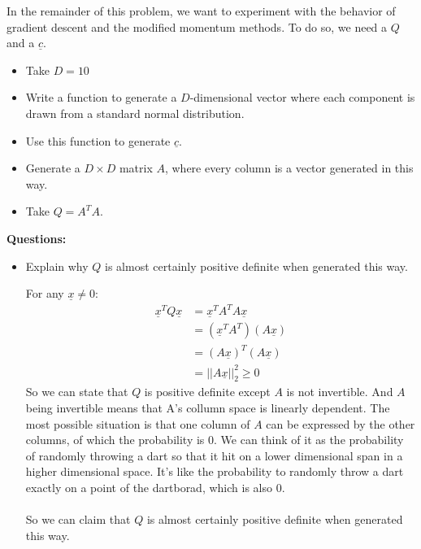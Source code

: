 \documentclass[11pt,letterpaper]{article}
\begin{document}
\bigskip
\begin{flushleft}
    In the remainder of this problem, we want to experiment with the behavior of gradient descent and the modified momentum methods. To do so, we need a $Q$ and a $\underline c$.
\end{flushleft}
\begin{itemize}
    \item Take $D = 10$

    \item Write a function to generate a $D$-dimensional vector where each component is drawn from a standard normal distribution.

    \item Use this function to generate $\underline c$.

    \item Generate a $D \times D$ matrix $A$, where every column is a vector generated in this way.

    \item Take $Q = A^TA$.
\end{itemize}
\begin{tcolorbox}
    \textbf{Questions:}
    \begin{itemize}
        \item Explain why $Q$ is almost certainly positive definite when generated this way.
        \\
        \begin{flushleft}
            For any $\underline x \not = 0$:
            \begin{align*}
                \underline x^T Q \underline x &= \underline x^T A^TA \underline x \\
                &= (\underline x^T A^T)(A \underline x) \\
                &= (A \underline x )^T(A \underline x)  \\
                &= ||A \underline x ||_2^2 \geq 0
            \end{align*}
            \justifying
            So we can state that $Q$ is positive definite except $A$ is not invertible. And $A$ being invertible means that A's collumn space is linearly dependent. The most possible situation is that one column of $A$ can be expressed by the other columns, of which the probability is $0$. We can think of it as the probability of randomly throwing a dart so that it hit on a lower dimensional span in a higher dimensional space. It's like the probability to randomly throw a dart exactly on a point of the dartborad, which is also $0$.
            \\
            \\
            So we can claim that $Q$ is almost certainly positive definite when generated this way.
        \end{flushleft}
    \end{itemize}
\end{tcolorbox}
\end{document}
